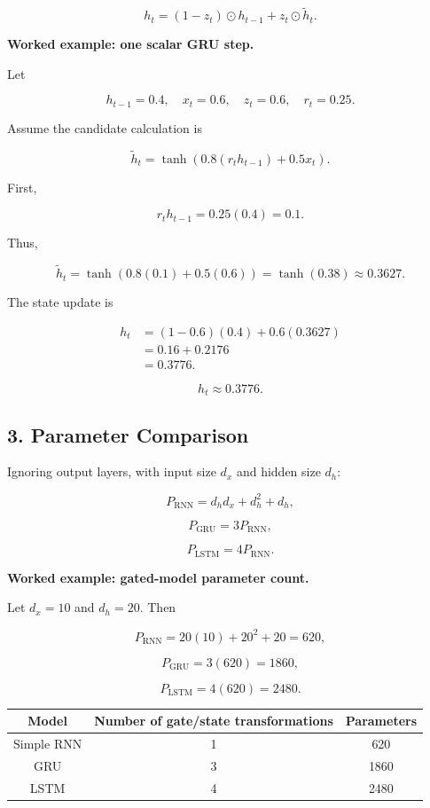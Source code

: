 \documentclass[11pt,a4paper,twoside]{article}
\begin{document}
\[
\boxed{h_t=(1-z_t)\odot h_{t-1}+z_t\odot\tilde h_t}.
\]

\textbf{Worked example: one scalar GRU step.}

Let

\[
h_{t-1}=0.4,
\quad x_t=0.6,
\quad z_t=0.6,
\quad r_t=0.25.
\]

Assume the candidate calculation is

\[
\tilde h_t=\tanh\left(0.8(r_th_{t-1})+0.5x_t\right).
\]

First,

\[
r_th_{t-1}=0.25(0.4)=0.1.
\]

Thus,

\[
\tilde h_t
=\tanh(0.8(0.1)+0.5(0.6))
=\tanh(0.38)
\approx0.3627.
\]

The state update is

\[
\begin{aligned}
h_t
&=(1-0.6)(0.4)+0.6(0.3627)\\
&=0.16+0.2176\\
&=0.3776.
\end{aligned}
\]

\[
\boxed{h_t\approx0.3776.}
\]

\subsection*{3. Parameter Comparison}

Ignoring output layers, with input size $d_x$ and hidden size $d_h$:

\[
P_{\mathrm{RNN}}=d_hd_x+d_h^2+d_h,
\]

\[
P_{\mathrm{GRU}}=3P_{\mathrm{RNN}},
\]

\[
P_{\mathrm{LSTM}}=4P_{\mathrm{RNN}}.
\]

\textbf{Worked example: gated-model parameter count.}

Let $d_x=10$ and $d_h=20$. Then

\[
P_{\mathrm{RNN}}=20(10)+20^2+20=620,
\]

\[
P_{\mathrm{GRU}}=3(620)=1860,
\]

\[
P_{\mathrm{LSTM}}=4(620)=2480.
\]

\begin{center}
\begin{tabular}{c|c|c}
\toprule
Model&Number of gate/state transformations&Parameters\\ \midrule
Simple RNN&1&620\\
GRU&3&1860\\
LSTM&4&2480\\ \bottomrule
\end{tabular}
\end{center}
\end{document}
